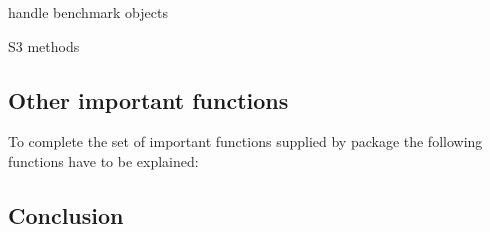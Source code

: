 handle benchmark objects

\begin{description}
\item[]
\item[]
\item[]
\item[]
\item[]
\item[]
\end{description}

S3 methods

\begin{description}
\item[]
\item[]
\end{description}

\subsection{Other important functions}

To complete the set of important functions supplied by package
 the following functions have to be explained:

\subsection{Conclusion}


